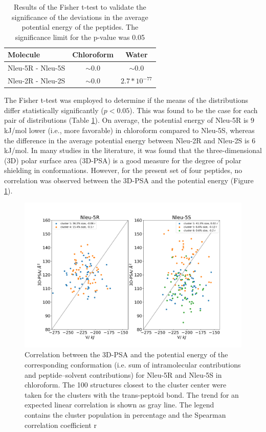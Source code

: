 \begin{table}[h!]
\centering
\caption{Results of the Fisher t-test to validate the significance of the deviations in the 
average potential energy of the peptides. The significance limit for the p-value was 0.05}
\label{tab: SIstatTestingDiff}
\begin{adjustbox}{max width=\textwidth}
\begin{tabular}{lcc}
Molecule          & Chloroform & Water     \\
\hline
Nleu-5R - Nleu-5S & $\sim$0.0  & $\sim$0.0 \\
Nleu-2R - Nleu-2S & $\sim$0.0  & $2.7*10^{-77}$\\
\hline
\end{tabular}%
\end{adjustbox}
\end{table}


The Fisher t-test \cite{Kotz1998} was employed to determine if the means of the distributions differ statistically significantly ($p < 0.05$). 
This was found to be the case for each pair of distributions (Table \ref{tab: SIstatTestingDiff}). 
On average, the potential energy of Nleu-5R is $9~$kJ/mol lower (i.e., more favorable) in chloroform compared to Nleu-5S, whereas the difference in the average potential energy between Nleu-2R and Nleu-2S is $6~$ kJ/mol. In many studies in the literature, it was found that the three-dimensional (3D) polar surface area (3D-PSA) is a good measure for the degree of polar shielding in conformations. \cite{Roux2020, Sebastiano2018, Vorherr2018, Peraro2018} 
However, for the present set of four peptides, no correlation was observed between the 3D-PSA and the potential energy (Figure \ref{fig: SI3DPSAANA}). 
\begin{figure}[h!]
    \centering
    \includegraphics[width=\textwidth]{7_chapter_5/fig/results/3dPSA.png}
    \caption{Correlation between the 3D-PSA and the potential energy of the corresponding conformation (i.e. sum of intramolecular contributions and peptide–solvent 
        contributions) for Nleu-5R and Nleu-5S in chloroform. The 100 structures closest to the cluster  center  were  taken  for  the  clusters  with  the  trans-peptoid  bond.  The  trend  for  an expected  linear  correlation  is  shown  as  gray  line.  The  legend  contains  the  cluster population in percentage and the Spearman correlation coefficient r}
    \label{fig: SI3DPSAANA}
\end{figure}


